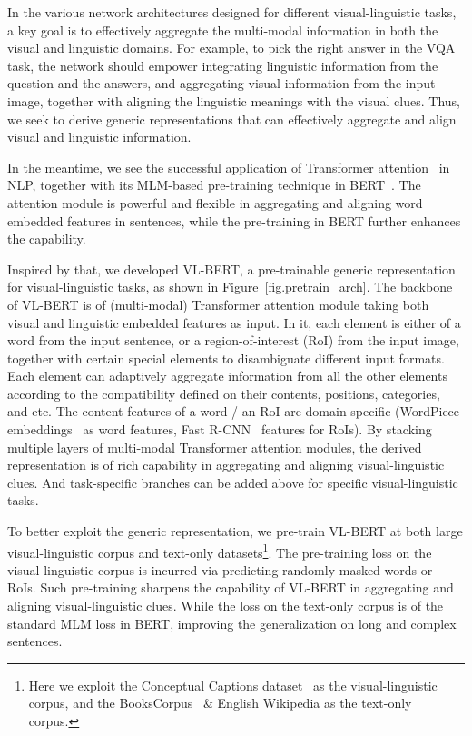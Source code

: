 \documentclass{article} \usepackage{iclr2020_conference,times}
\begin{document}
In the various network architectures designed for different visual-linguistic tasks, a key goal is to effectively aggregate the multi-modal information in both the visual and linguistic domains. For example, to pick the right answer in the VQA task, the network should empower integrating linguistic information from the question and the answers, and aggregating visual information from the input image, together with aligning the linguistic meanings with the visual clues. Thus, we seek to derive generic representations that can effectively aggregate and align visual and linguistic information.


In the meantime, we see the successful application of Transformer attention~\citep{vaswani2017transformer} in NLP, together with its MLM-based pre-training  technique in BERT~\citep{devlin2018bert}. The attention module is powerful and flexible in aggregating and aligning word embedded features in sentences, while the pre-training in BERT further enhances the capability.


Inspired by that, we developed VL-BERT, a pre-trainable generic representation for visual-linguistic tasks, as shown in Figure~\ref{fig.pretrain_arch}. The backbone of VL-BERT is of (multi-modal) Transformer attention module taking both visual and linguistic embedded features as input. In it, each element is either of a word from the input sentence, or a region-of-interest (RoI) from the input image, together with certain special elements to disambiguate different input formats. Each element can adaptively aggregate information from all the other elements according to the compatibility defined on their contents, positions, categories, and etc. The content features of a word / an RoI are domain specific (WordPiece embeddings~\citep{wu2016google} as word features, Fast R-CNN~\citep{girshick2015fast} features for RoIs). By stacking multiple layers of multi-modal Transformer attention modules, the derived representation is of rich capability in aggregating and aligning visual-linguistic clues. And task-specific branches can be added above for specific visual-linguistic tasks.


To better exploit the generic representation, we pre-train VL-BERT at both large visual-linguistic corpus and text-only datasets\footnote{Here we exploit the Conceptual Captions dataset~\citep{sharma2018conceptual} as the visual-linguistic corpus, and the BooksCorpus~\citep{zhu2015aligning} \& English Wikipedia as the text-only corpus.}. The pre-training loss on the visual-linguistic corpus is incurred via predicting randomly masked words or RoIs. Such pre-training sharpens the capability of VL-BERT in aggregating and aligning visual-linguistic clues. While the loss on the text-only corpus is of the standard MLM loss in BERT, improving the generalization on long and complex sentences. 
\end{document}
